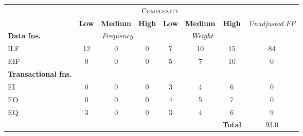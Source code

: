 
\begin{tabular}{|l|c|c|c|c|c|c|c|}
\cline{2-7}
\multicolumn{1}{c}{} & \multicolumn{6}{|c|}{\textsc{Complexity}} & \multicolumn{1}{c}{}  \\ \cline{2-8}
\multicolumn{1}{c|}{} & \textbf{Low} & \textbf{Medium} & \textbf{High} & \textbf{Low} & \textbf{Medium} & \textbf{High} & \multirow{2}{*}{\textit{Unadjusted FP}} \\ \cline{1-7}
\textbf{Data fns.} & \multicolumn{3}{|c|}{\textit{Frequency}} &  \multicolumn{3}{|c|}{\textit{Weight}} & \\ \hline
ILF 	& 12 & 0 & 0 & 7 & 10 & 15 & 84 	\\ \hline
EIF 	& 0 & 0 & 0 & 5 & 7 & 10 & 0		\\ \hline
\textbf{Transactional fns.} & \multicolumn{7}{|c|}{} \\ \hline
EI 		& 0 & 0 & 0 & 3 & 4 & 6 & 0 		\\ \hline
EO 		& 0 & 0 & 0 & 4 & 5 & 7 & 0		\\ \hline
EQ		& 3 & 0 & 0 & 3 & 4 & 6 & 9		\\ \hline
\multicolumn{6}{c|}{} & \textbf{Total} & 93.0 \\ \cline{7-8}
\end{tabular}
